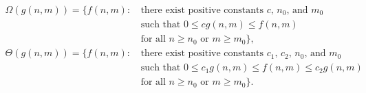 \liftdisplaystyle
\begin{align*}
    \Omega(g(n,m)) = \{f(n,m):\,{} & \text{there exist positive constants $c$, $n_0$, and $m_0$} \\
    & \text{such that } 0 \le cg(n,m) \le f(n,m) \\
    & \text{for all $n \ge n_0$ or $m \ge m_0$}\}, \\[2mm]
    \Theta(g(n,m)) = \{f(n,m):\,{} & \text{there exist positive constants $c_1$, $c_2$, $n_0$, and $m_0$} \\
    & \text{such that } 0 \le c_1g(n,m) \le f(n,m) \le c_2g(n,m) \\
    & \text{for all $n \ge n_0$ or $m \ge m_0$}\}.
\end{align*}
